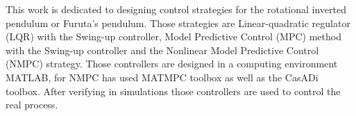 This work is dedicated to designing control strategies for the rotational inverted pendulum or Furuta’s pendulum. Those strategies are Linear-quadratic regulator (LQR) with the Swing-up controller, Model Predictive Control (MPC) method with the Swing-up controller and the Nonlinear Model Predictive Control (NMPC) strategy. Those controllers are designed in a computing environment MATLAB, for NMPC has used MATMPC toolbox as well as the CasADi toolbox. After verifying in simulations those controllers are used to control the real process.  
